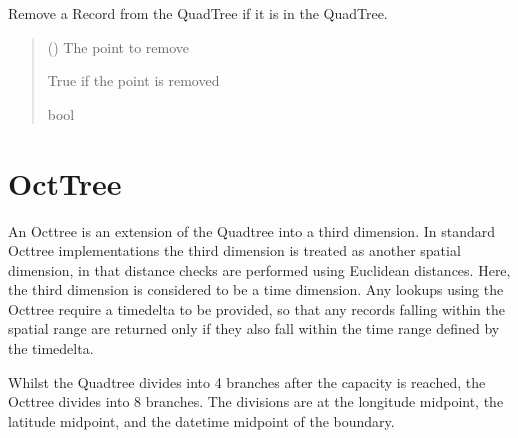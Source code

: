 \documentclass[letterpaper,10pt,english]{sphinxmanual}
\begin{document}
\begin{fulllineitems}

\begin{fulllineitems}
\label{\detokenize{quadtree:geotrees.quadtree.QuadTree.remove}}
\pysigstartsignatures
\pysiglinewithargsret
{}
{}
{}
\pysigstopsignatures
\sphinxAtStartPar
Remove a Record from the QuadTree if it is in the QuadTree.
\begin{quote}\begin{description}
\sphinxAtStartPar
{} ({\hyperref[\detokenize{record:geotrees.record.Record}]{}}) \textendash{} The point to remove

\sphinxAtStartPar
True if the point is removed

\sphinxAtStartPar
bool

\end{description}\end{quote}

\end{fulllineitems}


\end{fulllineitems}


\sphinxstepscope


\chapter{OctTree}
\label{\detokenize{octtree:octtree}}\label{\detokenize{octtree::doc}}
\sphinxAtStartPar
An Octtree is an extension of the Quadtree into a third dimension. In standard Octtree implementations the third
dimension is treated as another spatial dimension, in that distance checks are performed using Euclidean distances.
Here, the third dimension is considered to be a time dimension. Any look\sphinxhyphen{}ups using the Octtree require a timedelta to be
provided, so that any records falling within the spatial range are returned only if they also fall within the time range
defined by the timedelta.

\sphinxAtStartPar
Whilst the Quadtree divides into 4 branches after the capacity is reached, the Octtree divides into 8 branches. The
divisions are at the longitude midpoint, the latitude midpoint, and the datetime midpoint of the boundary.
\end{document}
